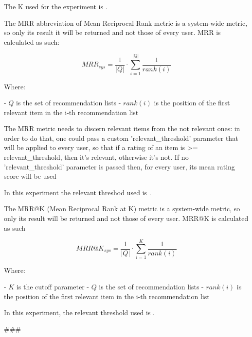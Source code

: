 The K used for the experiment is .


The MRR abbreviation of Mean Reciprocal Rank metric is a system-wide metric, so only its result it will be returned and not those
of every user. MRR is calculated as such:

    \[
    MRR_{sys} = \frac{1}{|Q|}\cdot\sum_{i=1}^{|Q|}\frac{1}{rank(i)}
    \]

    Where:

    - $Q$ is the set of recommendation lists
    - $rank(i)$ is the position of the first relevant item in the i-th recommendation list

\hfill\break

The MRR metric needs to discern relevant items from the not relevant ones: in order to do that, one could pass a
custom 'relevant_threshold' parameter that will be applied to every user, so that if a rating of an item
is >= relevant_threshold, then it's relevant, otherwise it's not.
If no 'relevant_threshold' parameter is passed then, for every user, its mean rating score will be used

In this experiment the relevant threshod used is
.



The MRR@K (Mean Reciprocal Rank at K) metric is a system-wide metric, so only its result will be returned and
not those of every user. MRR@K is calculated as such

    \[
    MRR@K_{sys} = \frac{1}{|Q|}\cdot\sum_{i=1}^{K}\frac{1}{rank(i)}
    \]

    Where:

    - $K$ is the cutoff parameter
    - $Q$ is the set of recommendation lists
    - $rank(i)$ is the position of the first relevant item in the i-th recommendation list

\hfill\break
In this experiment, the relevant threshold used is
.












###